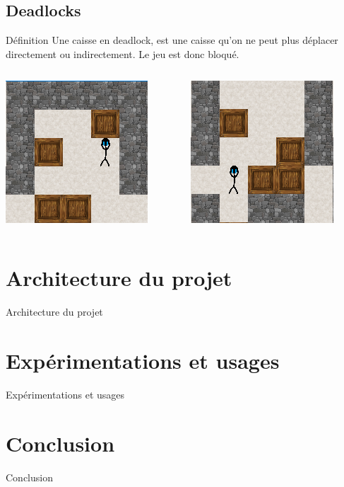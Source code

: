 \documentclass{beamer}
\begin{document}
\subsection{Deadlocks}

\begin{frame}

\begin{block}{Définition}
Une caisse en deadlock, est une caisse qu'on ne peut plus déplacer directement ou indirectement. Le jeu est donc bloqué.
\end{block}
\vspace{0.5cm}
\begin{center}
\begin{columns}
\begin{column}{4cm}
\includegraphics[scale=0.7]{images/deadlock1.PNG}
\end{column}
\begin{column}{4cm}
\includegraphics[scale=0.7]{images/deadlock2.PNG}
\end{column}
\end{columns}
\end{center}
\end{frame}

\begin{frame}

\end{frame}

\section{Architecture du projet}
\begin{frame}
Architecture du projet
\end{frame}
\section{Expérimentations et usages}
\begin{frame}
Expérimentations et usages
\end{frame}
\section{Conclusion}
\begin{frame}
Conclusion
\end{frame}
\end{document}

